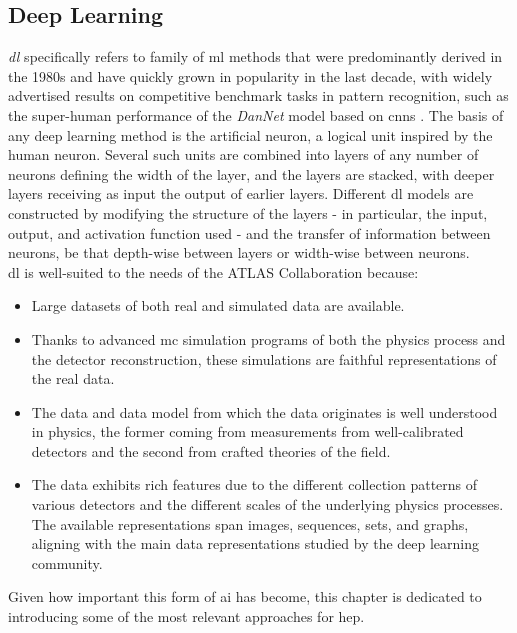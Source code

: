 \subsection{Deep Learning} 
\textit{\gls{dl}} specifically refers to family of \gls{ml} methods that were predominantly derived in the 1980s and have quickly grown in popularity in the last decade, with widely advertised results on competitive benchmark tasks in pattern recognition, such as the super-human performance of the \textit{DanNet} model \cite{DanNet} based on \glspl{cnn} \cite{NIPS198953c3bce6}. The basis of any deep learning method is the artificial neuron, a logical unit inspired by the human neuron. Several such units are combined into layers of any number of neurons defining the width of the layer, and the layers are stacked, with deeper layers receiving as input the output of earlier layers. Different \gls{dl} models are constructed by modifying the structure of the layers - in particular, the input, output, and activation function used - and the transfer of information between neurons, be that depth-wise between layers or width-wise between neurons. \\

\gls{dl} is well-suited to the needs of the ATLAS Collaboration because:
\begin{itemize}
    \item Large datasets of both real and simulated data are available.
    \item Thanks to advanced \gls{mc} simulation programs of both the physics process and the detector reconstruction, these simulations are faithful representations of the real data.
    \item The data and data model from which the data originates is well understood in physics, the former coming from measurements from well-calibrated detectors and the second from crafted theories of the field. 
    \item The data exhibits rich features due to the different collection patterns of various detectors and the different scales of the underlying physics processes. The available representations span images, sequences, sets, and graphs, aligning with the main data representations studied by the deep learning community.
\end{itemize}
Given how important this form of \gls{ai} has become, this chapter is dedicated to introducing some of the most relevant approaches for \gls{hep}. 

